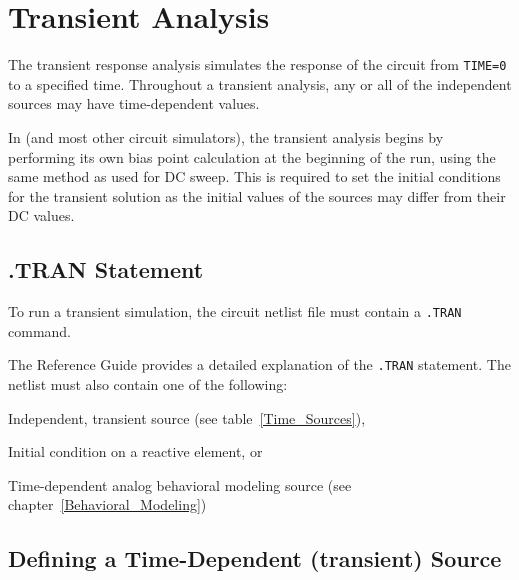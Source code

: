 \section{Transient Analysis}
\label{Trans_Overview}
\label{Transient_Analysis}
 

The transient response analysis simulates the response of the circuit
from \texttt{TIME=0} to a specified time.  Throughout a transient
analysis, any or all of the independent sources may have
time-dependent values.

In \Xyce{} (and most other circuit simulators), the transient analysis
begins by performing its own bias point calculation
at the beginning of the run, using the same method as used for DC
sweep. This is required to set the initial conditions for the
transient solution as the initial values of the sources may differ
from their DC values.

\subsection{.TRAN Statement}

To run a transient simulation, the circuit netlist file must contain a
\verb|.TRAN| command.


The \Xyce{} Reference Guide\ReferenceGuide{} provides a detailed
explanation of the \verb|.TRAN| statement. The netlist must also
contain one of the following:

\begin{XyceItemize}
\item Independent, transient source (see table~\ref{Time_Sources}),
\item Initial condition on a reactive element, or
\item Time-dependent analog behavioral modeling source (see chapter~\ref{Behavioral_Modeling})
\end{XyceItemize}

\subsection{Defining a Time-Dependent (transient) Source}
\label{Defining_Source}

